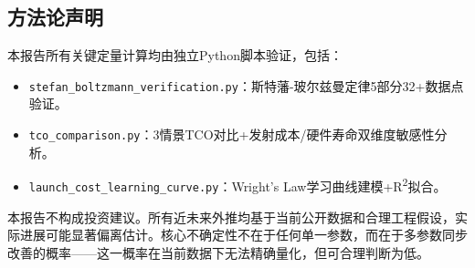 \subsection{方法论声明}

本报告所有关键定量计算均由独立Python脚本验证，包括：
\begin{itemize}[leftmargin=*]
    \item \texttt{stefan\_boltzmann\_verification.py}：斯特藩-玻尔兹曼定律5部分32+数据点验证\cite{note_sb_script}。
    \item \texttt{tco\_comparison.py}：3情景TCO对比+发射成本/硬件寿命双维度敏感性分析\cite{note_tco_script}。
    \item \texttt{launch\_cost\_learning\_curve.py}：Wright's Law学习曲线建模+R\textsuperscript{2}拟合\cite{note_launch_script}。
\end{itemize}

本报告不构成投资建议。所有近未来外推均基于当前公开数据和合理工程假设，实际进展可能显著偏离估计。核心不确定性不在于任何单一参数，而在于多参数同步改善的概率——这一概率在当前数据下无法精确量化，但可合理判断为低。


